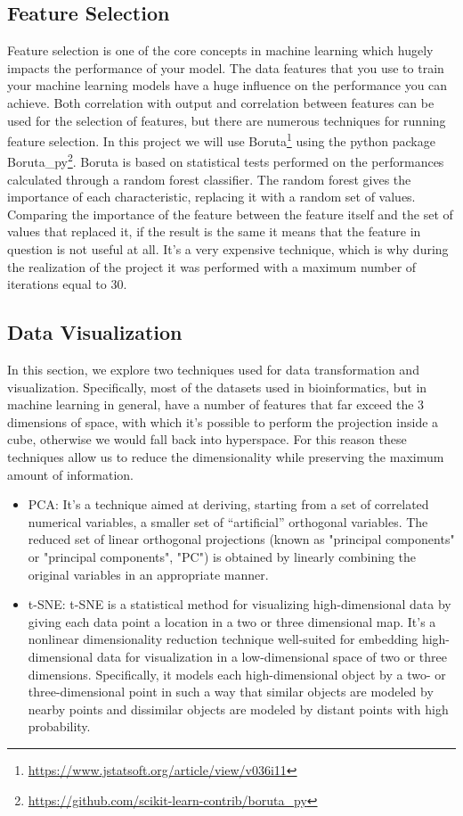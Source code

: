 \documentclass{article}
\begin{document}
\subsection{Feature Selection}
Feature selection is one of the core concepts in machine learning which hugely impacts the performance of your model. The data features that you use to train your machine learning models have a huge influence on the performance you can achieve. Both correlation with output and correlation between features can be used for the selection of features, but there are numerous techniques for running feature selection. In this project we will use Boruta\footnote{\url{https://www.jstatsoft.org/article/view/v036i11}} using the python package Boruta\_py\footnote{\url{https://github.com/scikit-learn-contrib/boruta_py}}. Boruta is based on statistical tests performed on the performances calculated through a random forest classifier. The random forest gives the importance of each characteristic, replacing it with a random set of values. Comparing the importance of the feature between the feature itself and the set of values that replaced it, if the result is the same it means that the feature in question is not useful at all. It's a very expensive technique, which is why during the realization of the project it was performed with a maximum number of iterations equal to 30.

\subsection{Data Visualization}
\label{sec:data_visualization}
In this section, we explore two techniques used for data transformation and visualization. Specifically, most of the datasets used in bioinformatics, but in machine learning in general, have a number of features that far exceed the 3 dimensions of space, with which it's possible to perform the projection inside a cube, otherwise we would fall back into hyperspace. For this reason these techniques allow us to reduce the dimensionality while preserving the maximum amount of information.
\begin{itemize}
    \item PCA: It's a technique aimed at deriving, starting from a set of correlated numerical variables, a smaller set of “artificial” orthogonal variables. The reduced set of linear orthogonal projections (known as "principal components" or "principal components", "PC") is obtained by linearly combining the original variables in an appropriate manner.
    \item t-SNE: t-SNE is a statistical method for visualizing high-dimensional data by giving each data point a location in a two or three dimensional map. It's a nonlinear dimensionality reduction technique well-suited for embedding high-dimensional data for visualization in a low-dimensional space of two or three dimensions. Specifically, it models each high-dimensional object by a two- or three-dimensional point in such a way that similar objects are modeled by nearby points and dissimilar objects are modeled by distant points with high probability.\cite{enwiki:1040619466}
\end{itemize}
    
\end{document}
